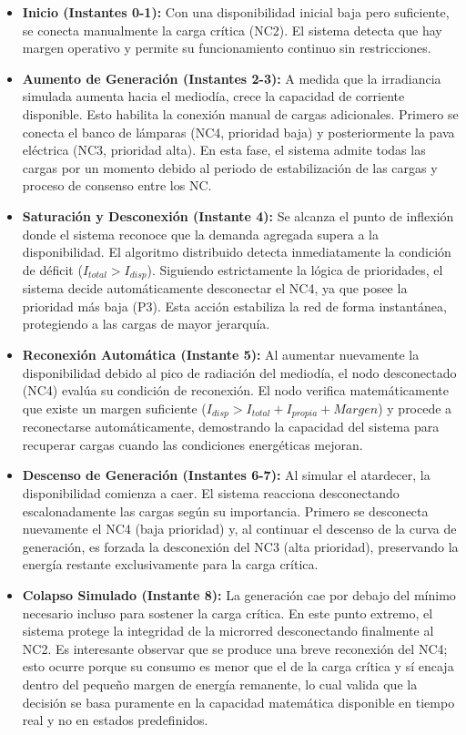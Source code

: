 \begin{itemize}
    \item \textbf{Inicio (Instantes 0-1):} Con una disponibilidad inicial baja pero suficiente, se conecta manualmente la carga crítica (NC2). El sistema detecta que hay margen operativo y permite su funcionamiento continuo sin restricciones.
    \item \textbf{Aumento de Generación (Instantes 2-3):} A medida que la irradiancia simulada aumenta hacia el mediodía, crece la capacidad de corriente disponible. Esto habilita la conexión manual de cargas adicionales. Primero se conecta el banco de lámparas (NC4, prioridad baja) y posteriormente la pava eléctrica (NC3, prioridad alta). En esta fase, el sistema admite todas las cargas por un momento debido al periodo de estabilización de las cargas y proceso de consenso entre los NC.
    \item \textbf{Saturación y Desconexión (Instante 4):} Se alcanza el punto de inflexión donde el sistema reconoce que la demanda agregada supera a la disponibilidad. El algoritmo distribuido detecta inmediatamente la condición de déficit ($I_{total} > I_{disp}$). Siguiendo estrictamente la lógica de prioridades, el sistema decide automáticamente desconectar el NC4, ya que posee la prioridad más baja (P3). Esta acción estabiliza la red de forma instantánea, protegiendo a las cargas de mayor jerarquía.
    \item \textbf{Reconexión Automática (Instante 5):} Al aumentar nuevamente la disponibilidad debido al pico de radiación del mediodía, el nodo desconectado (NC4) evalúa su condición de reconexión. El nodo verifica matemáticamente que existe un margen suficiente ($I_{disp} > I_{total} + I_{propia} + Margen$) y procede a reconectarse automáticamente, demostrando la capacidad del sistema para recuperar cargas cuando las condiciones energéticas mejoran.
    \item \textbf{Descenso de Generación (Instantes 6-7):} Al simular el atardecer, la disponibilidad comienza a caer. El sistema reacciona desconectando escalonadamente las cargas según su importancia. Primero se desconecta nuevamente el NC4 (baja prioridad) y, al continuar el descenso de la curva de generación, es forzada la desconexión del NC3 (alta prioridad), preservando la energía restante exclusivamente para la carga crítica.
    \item \textbf{Colapso Simulado (Instante 8):} La generación cae por debajo del mínimo necesario incluso para sostener la carga crítica. En este punto extremo, el sistema protege la integridad de la microrred desconectando finalmente al NC2. Es interesante observar que se produce una breve reconexión del NC4; esto ocurre porque su consumo es menor que el de la carga crítica y sí encaja dentro del pequeño margen de energía remanente, lo cual valida que la decisión se basa puramente en la capacidad matemática disponible en tiempo real y no en estados predefinidos.
\end{itemize}

